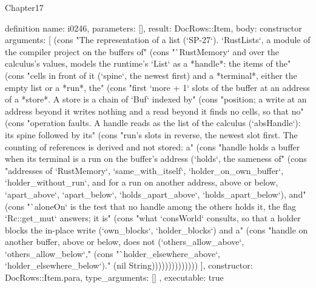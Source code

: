 \begin{lexlean}{Chapter17}
\begin{semanticmodule}
definition{
  name: i0246,
  parameters: [],
  result: DocRows::Item,
  body: constructor{
    arguments: [
      (cons "The representation of a list (`SP-27`). `RustLists`, a module of the compiler project on the buffers of" (cons "`RustMemory` and over the calculus's values, models the runtime's `List` as a *handle*: the items of the" (cons "cells in front of it (`spine`, the newest first) and a *terminal*, either the empty list or a *run*, the" (cons "first `more + 1` slots of the buffer at an address of a *store*. A store is a chain of `Buf` indexed by" (cons "position; a write at an address beyond it writes nothing and a read beyond it finds no cells, so that no" (cons "operation faults. A handle reads as the list of the calculus (`absHandle`): its spine followed by its" (cons "run's slots in reverse, the newest slot first. The counting of references is derived and not stored: a" (cons "handle holds a buffer when its terminal is a run on the buffer's address (`holds`, the sameness of" (cons "addresses of `RustMemory`, `same_with_itself`, `holder_on_own_buffer`, `holder_without_run`, and for a run on another address, above or below, `apart_above`, `apart_below`, `holds_apart_above`, `holds_apart_below`), and" (cons "`aloneOn` is the test that no handle among the others holds it, the flag `Rc::get_mut` answers; it is" (cons "what `consWorld` consults, so that a holder blocks the in-place write (`own_blocks`, `holder_blocks`) and a" (cons "handle on another buffer, above or below, does not (`others_allow_above`, `others_allow_below`," (cons "`holder_elsewhere_above`, `holder_elsewhere_below`)." (nil String))))))))))))))
    ],
    constructor: DocRows::Item.para,
    type_arguments: []
  },
  executable: true
}


\end{semanticmodule}
\end{lexlean}
